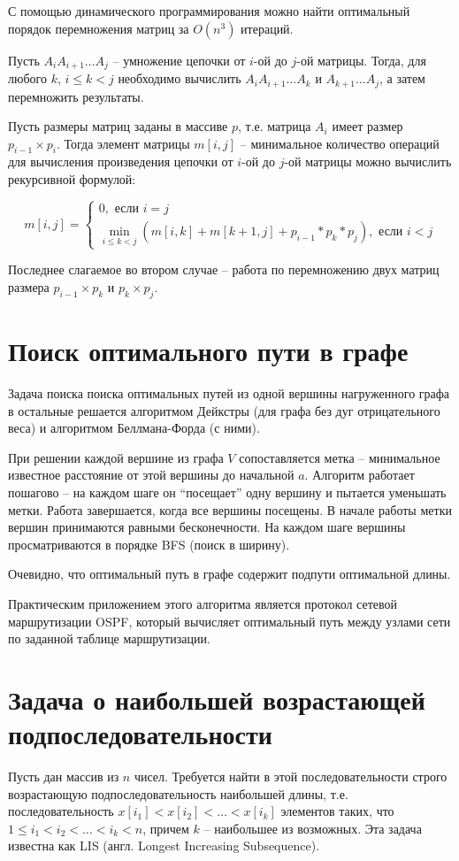 \documentclass[a4paper,11pt]{article}
\begin{document}
С помощью динамического программирования можно найти оптимальный порядок
перемножения матриц за $O(n^3)$ итераций.

Пусть $A_i A_{i+1} \ldots A_j$ -- умножение цепочки от $i$-ой до $j$-ой матрицы.
Тогда, для любого $k$, $i \leqslant k < j$ необходимо вычислить 
$A_i A_{i+1} \ldots A_k$ и $A_{k+1} \ldots A_j$, а затем перемножить результаты.

Пусть размеры матриц заданы в массиве $p$, т.е. матрица $A_i$ имеет размер
$p_{i-1} \times p_i$. Тогда элемент матрицы $m[i, j]$ -- минимальное количество
операций для вычисления произведения цепочки от $i$-ой до $j$-ой матрицы
можно вычислить рекурсивной формулой:

\begin{equation*}
  m[i, j] = \begin{cases}
    0, \text{ если } i = j \\
    \min_{i \leqslant k < j} (m[i, k] + m[k+1, j] + p_{i-1}*p_k*p_j),
    \text{ если } i < j
    \end{cases}
\end{equation*}

Последнее слагаемое во втором случае -- работа по перемножению двух матриц
размера $p_{i-1} \times p_k$ и $p_k \times p_j$.

\section{Поиск оптимального пути в графе}
Задача поиска поиска оптимальных путей из одной вершины нагруженного графа
в остальные решается алгоритмом Дейкстры (для графа без дуг отрицательного
веса) и алгоритмом Беллмана-Форда (с ними). 

При решении каждой вершине из графа $V$ сопоставляется метка -- минимальное
известное расстояние от этой вершины до начальной $a$. Алгоритм работает
пошагово -- на каждом шаге он ``посещает'' одну вершину и пытается уменьшать
метки. Работа завершается, когда все вершины посещены. В начале работы метки
вершин принимаются равными бесконечности. На каждом шаге вершины
просматриваются в порядке BFS (поиск в ширину).

Очевидно, что оптимальный путь в графе содержит подпути оптимальной длины.

Практическим приложением этого алгоритма является протокол сетевой
маршрутизации OSPF, который вычисляет оптимальный путь между узлами сети по
заданной таблице маршрутизации.

\section{Задача о наибольшей возрастающей подпоследовательности}
Пусть дан массив из $n$ чисел. Требуется найти в этой последовательности
строго возрастающую подпоследовательность наибольшей длины, т.е. 
последовательность $x[i_1] < x[i_2] < \ldots < x[i_k]$ элементов таких,
что $1 \leqslant i_1 < i_2 < \ldots < i_k < n$, причем $k$ -- наибольшее из
возможных. Эта задача известна как LIS (англ. Longest Increasing Subsequence).
\end{document}
